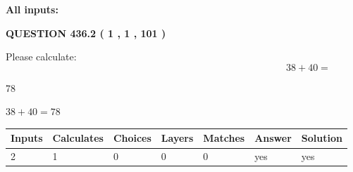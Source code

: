 \documentclass[12pt]{article}
\begin{document}
   
\noindent{}
   
   
   
   
\noindent\vspace{0.1in}\hspace{-0.08in} {\textbf{\Large{All inputs: }}}
   
   
  
\vspace{0.2in}
  
{\textbf{\Large{QUESTION
436.2 
 ( 1 , 1 , 101 )
}}}
  
  
 
Please calculate:
\begin{equation}
38 +  %
40 = \nonumber
\end{equation}
 
 
 
\noindent{}
 
 

78
 
 
\noindent{}
 
 

 
 
 
\noindent{}
 
 

$ %
38 +  %
40=   %
78$
 
 
\noindent{}
 
 

 
   
   
   
   
\noindent\begin{tabular}{|l|l|l|l|l|l|l|}
 \hline
Inputs & Calculates & Choices & Layers & Matches & Answer & Solution \\ \hline
 2  & 
 1  & 
 0
  & 
 0  & 
 0  & 
  yes & 
  yes 
  \\ \hline
 \end{tabular}
   
   
   
   
\noindent{}
   
   
  
\end{document}
